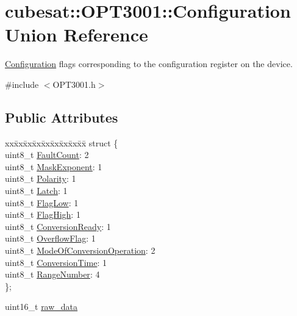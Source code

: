 \hypertarget{unioncubesat_1_1OPT3001_1_1Configuration}{}\section{cubesat\+:\+:O\+P\+T3001\+:\+:Configuration Union Reference}
\label{unioncubesat_1_1OPT3001_1_1Configuration}


\hyperlink{unioncubesat_1_1OPT3001_1_1Configuration}{Configuration} flags corresponding to the configuration register on the device.  




{\ttfamily \#include $<$O\+P\+T3001.\+h$>$}

\subsection*{Public Attributes}
\begin{DoxyCompactItemize}
\item 
\begin{tabbing}
xx\=xx\=xx\=xx\=xx\=xx\=xx\=xx\=xx\=\kill
struct \{\\
\>uint8\_t \hyperlink{unioncubesat_1_1OPT3001_1_1Configuration_aba3ee5b0e9c2a28707cec7979287da18}{FaultCount}: 2\\
\>uint8\_t \hyperlink{unioncubesat_1_1OPT3001_1_1Configuration_a0b7f2e67d9103f03a9c5ac1d787edaae}{MaskExponent}: 1\\
\>uint8\_t \hyperlink{unioncubesat_1_1OPT3001_1_1Configuration_a9be11aa37945c839ecbdbb82b110306c}{Polarity}: 1\\
\>uint8\_t \hyperlink{unioncubesat_1_1OPT3001_1_1Configuration_ab7abbbb5c58ffcc98b43e820e17580dd}{Latch}: 1\\
\>uint8\_t \hyperlink{unioncubesat_1_1OPT3001_1_1Configuration_a4e210133a90a7bbdf90273cfa53d4c6b}{FlagLow}: 1\\
\>uint8\_t \hyperlink{unioncubesat_1_1OPT3001_1_1Configuration_a6a4c40221beb13c4d839bc290849f2e8}{FlagHigh}: 1\\
\>uint8\_t \hyperlink{unioncubesat_1_1OPT3001_1_1Configuration_a1aca1b929f8e213896685d1981c8fe4a}{ConversionReady}: 1\\
\>uint8\_t \hyperlink{unioncubesat_1_1OPT3001_1_1Configuration_a5515ab2a3c0910b2f4df52ecc533527c}{OverflowFlag}: 1\\
\>uint8\_t \hyperlink{unioncubesat_1_1OPT3001_1_1Configuration_a18d5dc05b1f00f195631034d66fa46d1}{ModeOfConversionOperation}: 2\\
\>uint8\_t \hyperlink{unioncubesat_1_1OPT3001_1_1Configuration_ab978a7d7505ad3a69112c6cd437b595e}{ConversionTime}: 1\\
\>uint8\_t \hyperlink{unioncubesat_1_1OPT3001_1_1Configuration_a2f55f001b9254f9937781848c3354d9e}{RangeNumber}: 4\\
\}; \\

\end{tabbing}\item 
uint16\+\_\+t \hyperlink{unioncubesat_1_1OPT3001_1_1Configuration_a0ff485276b8cd27662ad0331e3c54b5b}{raw\+\_\+data}
\end{DoxyCompactItemize}


